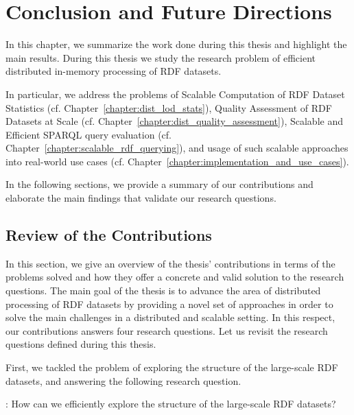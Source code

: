 \chapter{Conclusion and Future Directions}
\label{chapter:conclusion}

In this chapter, we summarize the work done during this thesis and highlight the main results.
During this thesis we study the research problem of efficient distributed in-memory processing of \gls{RDF} datasets.

In particular, we address the problems of Scalable Computation of \gls{RDF} Dataset Statistics (cf. Chapter~\ref{chapter:dist_lod_stats}), Quality Assessment of \gls{RDF} Datasets at Scale (cf. Chapter~\ref{chapter:dist_quality_assessment}), Scalable and Efficient \gls{SPARQL} query evaluation (cf. Chapter~\ref{chapter:scalable_rdf_querying}), and usage of such scalable approaches into real-world use cases (cf. Chapter~\ref{chapter:implementation_and_use_cases}).

In the following sections, we provide a summary of our contributions and elaborate the main findings that validate our research questions.

\section{Review of the Contributions}
In this section, we give an overview of the thesis' contributions in terms of the problems solved and how they offer a concrete and valid solution to the research questions.
The main goal of the thesis is to advance the area of distributed processing of \gls{RDF} datasets by providing a novel set of approaches in order to solve the main challenges in a distributed and scalable setting.
In this respect, our contributions answers four research questions.
Let us revisit the research questions defined during this thesis.

First, we tackled the problem of exploring the structure of the large-scale \gls{RDF} datasets, and answering the following research question.

\begin{tcolorbox}
\textbf{\rqNr[RQ1]\label{rqc:1}}: How can we efficiently explore the structure of the large-scale \gls{RDF} datasets?
\end{tcolorbox}


